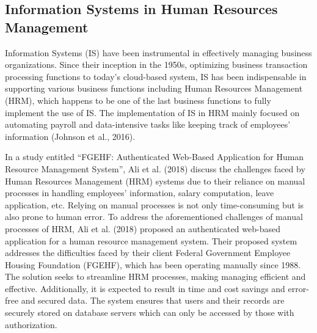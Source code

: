 \documentclass[journal]{./IEEE/IEEEtran}
\begin{document}
\subsection{\textbf{Information Systems in Human Resources Management}}

Information Systems (IS) have been instrumental in effectively managing business organizations. Since their inception in the 1950s, optimizing business transaction processing functions to today’s cloud-based system, IS has been indispensable in supporting various business functions including Human Resources Management (HRM), which happens to be one of the last business functions to fully implement the use of IS. The implementation of IS in HRM mainly focused on automating payroll and data-intensive tasks like keeping track of employees’ information (Johnson et al., 2016).

In a study entitled “FGEHF: Authenticated Web-Based Application for Human Resource Management System”, Ali et al. (2018) discuss the challenges faced by Human Resources Management (HRM) systems due to their reliance on manual processes in handling employees’ information, salary computation, leave application, etc. Relying on manual processes is not only time-consuming but is also prone to human error. To address the aforementioned challenges of manual processes of HRM, Ali et al. (2018) proposed an authenticated web-based application for a human resource management system. Their proposed system addresses the difficulties faced by their client Federal Government Employee Housing Foundation (FGEHF), which has been operating manually since 1988. The solution seeks to streamline HRM processes, making managing efficient and effective. Additionally, it is expected to result in time and cost savings and error-free and secured data. The system ensures that users and their records are securely stored on database servers which can only be accessed by those with authorization. 
\end{document}
